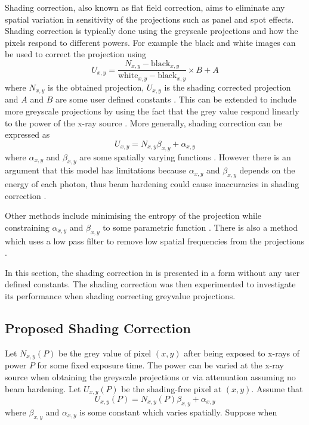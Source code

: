 Shading correction, also known as flat field correction, aims to eliminate any spatial variation in sensitivity of the projections such as panel and spot effects. Shading correction is typically done using the greyscale projections and how the pixels respond to different powers. For example the black and white images can be used to correct the projection using
\begin{equation}
U_{x,y} = \dfrac{N_{x,y}-\text{black}_{x,y}}{\text{white}_{x,y}-\text{black}_{x,y}}\times B+A
\end{equation}
where $N_{x,y}$ is the obtained projection, $U_{x,y}$ is the shading corrected projection and $A$ and $B$ are some user defined constants \citep{young2000shading, munzenmayer2003enhancing}. This can be extended to include more greyscale projections by using the fact that the grey value respond linearly to the power of the x-ray source \citep{seibert1998flat}. More generally, shading correction can be expressed as
\begin{equation}
U_{x,y} = N_{x,y} \beta_{x,y} + \alpha_{x,y}
\end{equation}
where $\alpha_{x,y}$ and $\beta_{x,y}$ are some spatially varying functions \citep{munzenmayer2003enhancing}. However there is an argument that this model has limitations because $\alpha_{x,y}$ and $\beta_{x,y}$ depends on the energy of each photon, thus beam hardening could cause inaccuracies in shading correction \citep{davidson2003limitations}.

Other methods include minimising the entropy of the projection while constraining $\alpha_{x,y}$ and $\beta_{x,y}$ to some parametric function \citep{likar2000retrospective}. There is also a method which uses a low pass filter to remove low spatial frequencies from the projections \citep{young2000shading, munzenmayer2003enhancing}.

In this section, the shading correction in \cite{seibert1998flat} is presented in a form without any user defined constants. The shading correction was then experimented to investigate its performance when shading correcting greyvalue projections.

\subsection{Proposed Shading Correction}

Let $N_{x,y}(P)$ be the grey value of pixel $(x,y)$ after being exposed to x-rays of power $P$ for some fixed exposure time. The power can be varied at the x-ray source when obtaining the greyscale projections or via attenuation assuming no beam hardening. Let $U_{x,y}(P)$ be the shading-free pixel at $(x,y)$. Assume that
\begin{equation}
U_{x,y}(P) = N_{x,y}(P)\beta_{x,y}+\alpha_{x,y}
\end{equation}
where $\beta_{x,y}$ and $\alpha_{x,y}$ is some constant which varies spatially. Suppose when

